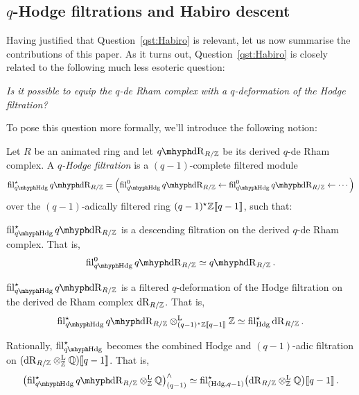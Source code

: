 \documentclass[DIV=12,numbers=enddot,leqno,bibliography=totoc]{scrartcl}
\begin{document}
	\subsection{\texorpdfstring{$q$}{q}-Hodge filtrations and Habiro descent}
	Having justified that Question~\cref{qst:Habiro} is relevant, let us now summarise the contributions of this paper. As it turns out, Question~\cref{qst:Habiro} is closely related to the following much less esoteric question:
	\begin{numpar}[Question.]\label{qst:qHodgeFiltration}\itshape
		Is it possible to equip the $q$-de Rham complex with a $q$-deformation of the Hodge filtration?
	\end{numpar}
	To pose this question more formally, we'll introduce the following notion:
	\begin{defi}\label{def:qHodgeIntro}
		Let $R$ be an animated ring and let $\qdeRham_{R/\IZ}$ be its derived $q$-de Rham complex. A \emph{$q$-Hodge filtration} is a $(q-1)$-complete filtered module
		\begin{equation*}
			\fil_{\qHodge}^\star\qdeRham_{R/\IZ}= \Bigl(\fil_{\qHodge}^0\qdeRham_{R/\IZ}\leftarrow\fil_{\qHodge}^0\qdeRham_{R/\IZ}\leftarrow\dotsb\Bigr)
		\end{equation*}
		over the $(q-1)$-adically filtered ring $(q-1)^\star \mathbb{Z}\llbracket q-1\rrbracket$, such that:
		\begin{alphanumerate}
			\item $\fil_{\qHodge}^\star\qdeRham_{R/\IZ}$ is a descending filtration on the derived $q$-de Rham complex. That is,\label{enum:qHodgeIntroa}
			\begin{equation*}
				\fil_{\qHodge}^0\qdeRham_{R/\IZ}\simeq \qdeRham_{R/\IZ}\,.
			\end{equation*}
			\item $\fil_{\qHodge}^\star\qdeRham_{R/\IZ}$ is a filtered $q$-deformation of the Hodge filtration on the derived de Rham complex $\mathrm{dR}_{R/\mathbb{Z}}$. That is,\label{enum:qHodgeIntrob}
			\begin{equation*}
				\fil_{\qHodge}^\star \qdeRham_{R/\IZ}\lotimes_{(q-1)^\star\IZ\qpower}\IZ\simeq \fil_{\Hodge}^\star\deRham_{R/\IZ}\,.
			\end{equation*}
			\item Rationally, $\fil_{\qHodge}^\star$ becomes the combined Hodge and $(q-1)$-adic filtration on $(\mathrm{dR}_{R/\mathbb{Z}}\otimes^{\mathrm{L}}_{\mathbb{Z}}\mathbb{Q})\llbracket q-1\rrbracket$. That is,\label{enum:qHodgeIntroc}
			\begin{equation*}
				\bigl(\fil_{\qHodge}^\star\qdeRham_{R/\IZ}\lotimes_\IZ\IQ\bigr)_{(q-1)}^\complete\simeq \fil_{(\Hodge,q-1)}^\star\bigl(\deRham_{R/\IZ}\lotimes_\IZ\IQ\bigr)\qpower\,.

\end{equation*}
\end{alphanumerate}
\end{defi}
\end{document}
